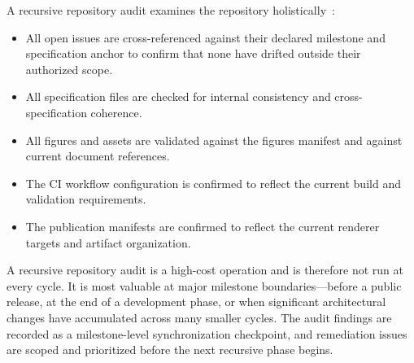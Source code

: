 A recursive repository audit examines the repository holistically~\cite{Wiener1948Cybernetics}:
\begin{itemize}
  \item All open issues are cross-referenced against their declared milestone and specification anchor to confirm that none have drifted outside their authorized scope.
  \item All specification files are checked for internal consistency and cross-specification coherence.
  \item All figures and assets are validated against the figures manifest and against current document references.
  \item The CI workflow configuration is confirmed to reflect the current build and validation requirements.
  \item The publication manifests are confirmed to reflect the current renderer targets and artifact organization.
\end{itemize}

A recursive repository audit is a high-cost operation and is therefore not run at every cycle. It is most valuable at major milestone boundaries---before a public release, at the end of a development phase, or when significant architectural changes have accumulated across many smaller cycles. The audit findings are recorded as a milestone-level synchronization checkpoint, and remediation issues are scoped and prioritized before the next recursive phase begins.
